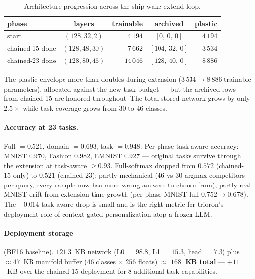 \documentclass[11pt]{article}
\begin{document}
\begin{table}[h]
  \centering
  \caption{Architecture progression across the ship-wake-extend loop.}
  \label{tab:extension}
  \begin{tabular}{lcrcr}
    \toprule
    phase                & layers          & trainable    & archived             & plastic       \\
    \midrule
    start                & $(128, 32, 2)$  & $4\,194$     & $[0,\,0,\,0]$        & $4\,194$      \\
    chained-15 done      & $(128, 48, 30)$ & $7\,662$     & $[104,\,32,\,0]$     & $3\,534$      \\
    chained-23 done      & $(128, 80, 46)$ & $14\,046$    & $[128,\,40,\,0]$     & $8\,886$      \\
    \bottomrule
  \end{tabular}
\end{table}

The plastic envelope more than doubles during extension
($3\,534 \to 8\,886$ trainable parameters), allocated against the new task
budget --- but the archived rows from chained-15 are honored throughout.
The total stored network grows by only $2.5\times$ while task coverage
grows from $30$ to $46$ classes.

\paragraph{Accuracy at 23 tasks.}
Full $= 0.521$, domain $= 0.693$, task $= 0.948$. Per-phase task-aware
accuracy: MNIST $0.970$, Fashion $0.982$, EMNIST $0.927$ --- original
tasks survive through the extension at task-aware $\geq 0.93$.
Full-softmax dropped from $0.572$ (chained-15-only) to $0.521$
(chained-23): partly mechanical ($46$ vs $30$ argmax competitors per
query, every sample now has more wrong answers to choose from), partly
real MNIST drift from extension-time growth (per-phase MNIST full
$0.752 \to 0.678$). The $-0.014$ task-aware drop is small and is the
right metric for trioron's deployment role of context-gated
personalization atop a frozen LLM.

\paragraph{Deployment storage} (BF16 baseline).
$121.3$~KB network (L0 $= 98.8$, L1 $= 15.3$, head $= 7.3$) plus
$\approx\!47$~KB manifold buffer ($46$ classes $\times$ $256$ floats)
$\approx$ \textbf{$168$~KB total} --- $+11$~KB over the chained-15
deployment for $8$ additional task capabilities.
\end{document}
